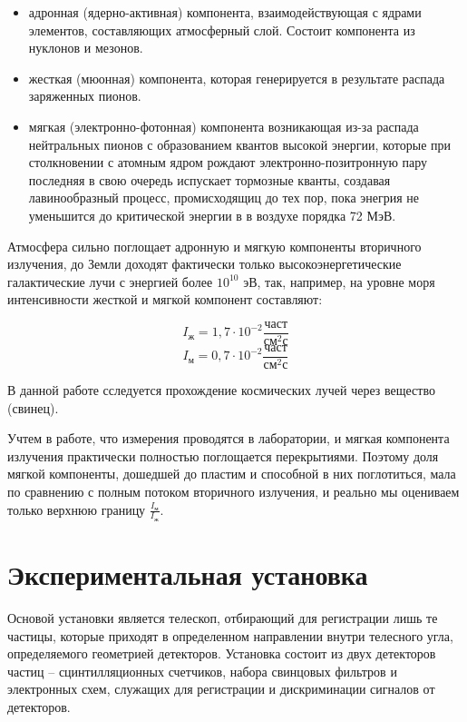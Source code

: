 \documentclass[15pt,a5paper,reqno]{article}
\begin{document}
\begin{itemize}
  \item адронная (ядерно-активная) компонента, взаимодействующая с ядрами элементов, составляющих атмосферный слой. Состоит компонента из нуклонов и мезонов.
  \item жесткая (мюонная) компонента, которая генерируется в результате распада заряженных пионов.
  \item мягкая (электронно-фотонная) компонента возникающая из-за распада нейтральных пионов с образованием квантов высокой энергии, которые при столкновении с атомным ядром рождают
  электронно-позитронную пару последняя в свою очередь испускает тормозные кванты, создавая лавинообразный процесс, промисходящиц до тех пор, пока энегрия не уменьшится до критической энергии в в воздухе порядка 72 МэВ.

\end{itemize}

Атмосфера сильно поглощает адронную и мягкую компоненты вторичного излучения, до Земли доходят фактически только высокоэнергетические галактические лучи с энергией более $10^{10}$ эВ, так, 
например, на уровне моря интенсивности жесткой и мягкой компонент составляют:

\[ I_ж = 1,7 \cdot 10^{-2} \text{$\frac{част}{см^{2} с}$}  \]
\[ I_м = 0,7 \cdot 10^{-2} \text{$\frac{част}{см^{2} с}$} \] 

В данной работе сследуется прохождение космических лучей через вещество (свинец).

Учтем в работе, что измерения проводятся в лаборатории, и мягкая компонента излучения практически полностью поглощается перекрытиями. Поэтому доля мягкой компоненты, 
дошедшей до пластим и способной в них поглотиться, мала по сравнению с полным потоком вторичного излучения, и реально мы оцениваем только верхнюю границу $\frac{I_м}{I_ж}$.

\section{Экспериментальная установка}

Основой установки является телескоп, отбирающий для регистрации лишь те частицы,
которые приходят в определенном направлении внутри телесного угла, определяемого
геометрией детекторов.
Установка состоит из двух детекторов частиц – сцинтилляционных счетчиков, набора
свинцовых фильтров и электронных схем, служащих для регистрации и дискриминации
сигналов от детекторов.
\end{document}
